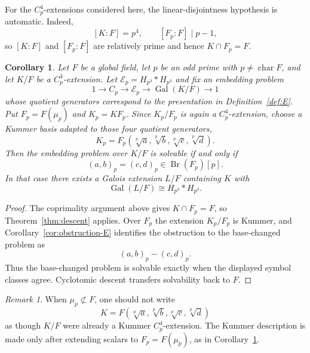 \documentclass[12pt]{amsart}
\newtheorem{corollary}[theorem]{Corollary}
\theoremstyle{definition}
\theoremstyle{remark}
\newtheorem{remark}[theorem]{Remark}
\DeclareMathOperator{\Gal}{Gal}
\DeclareMathOperator{\Br}{Br}
\newcommand{\Hp}{H_{p^3}}
\newcommand{\E}{\mathcal E_p}
\begin{document}
For the $C_p^4$-extensions considered here, the linear-disjointness
hypothesis is automatic. Indeed,
\[
 [K:F]=p^4,
 \qquad
 [F_p:F]\mid p-1,
\]
so $[K:F]$ and $[F_p:F]$ are relatively prime and hence
$K\cap F_p=F$.

\begin{corollary}\label{cor:no-roots-unity}
Let $F$ be a global field, let $p$ be an odd prime with
$p\neq\operatorname{char}F$, and let $K/F$ be a $C_p^4$-extension. Let
$\E=\Hp*\Hp$ and fix an embedding problem
\[
 1\longrightarrow C_p\longrightarrow\E
 \longrightarrow\Gal(K/F)\longrightarrow1
\]
whose quotient generators correspond to the presentation in
Definition~\ref{def:E}. Put $F_p=F(\mu_p)$ and $K_p=KF_p$. Since
$K_p/F_p$ is again a $C_p^4$-extension, choose a Kummer basis adapted to
those four quotient generators,
\[
 K_p=F_p(\sqrt[p]{a},\sqrt[p]{b},\sqrt[p]{c},\sqrt[p]{d}).
\]
Then the embedding problem over $K/F$ is solvable if and only if
\[
 (a,b)_p=(c,d)_p\in\Br(F_p)[p].
\]
In that case there exists a Galois extension $L/F$ containing $K$ with
\[
 \Gal(L/F)\cong\Hp*\Hp.
\]
\end{corollary}

\begin{proof}
The coprimality argument above gives $K\cap F_p=F$, so
Theorem~\ref{thm:descent} applies. Over $F_p$ the extension $K_p/F_p$ is
Kummer, and Corollary~\ref{cor:obstruction-E} identifies the obstruction to
the base-changed problem as
\[
 (a,b)_p-(c,d)_p.
\]
Thus the base-changed problem is solvable exactly when the displayed symbol
classes agree. Cyclotomic descent transfers solvability back to $F$.
\end{proof}

\begin{remark}
When $\mu_p\not\subset F$, one should not write
\[
 K=F(\sqrt[p]{a},\sqrt[p]{b},\sqrt[p]{c},\sqrt[p]{d})
\]
as though $K/F$ were already a Kummer $C_p^4$-extension. The Kummer
description is made only after extending scalars to $F_p=F(\mu_p)$, as in
Corollary~\ref{cor:no-roots-unity}.
\end{remark}


\end{document}
